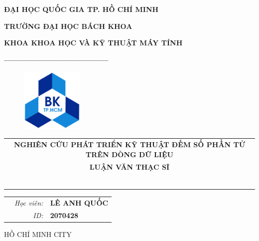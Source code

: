 \documentclass[a4paper,13pt]{article}
\theoremstyle{mytheor}
\begin{document}
\begin{titlepage}
\begin{center} {\textbf{ĐẠI HỌC QUỐC GIA TP. HỒ CHÍ MINH}
}

{\textbf{TRƯỜNG ĐẠI HỌC BÁCH KHOA}
}

{\textbf{KHOA KHOA HỌC VÀ KỸ THUẬT MÁY TÍNH }
}

{\textbf{---------------------------------------}}

\end{center}

\vspace{1cm}

\begin{figure}[h!]
\begin{center}
\includegraphics[width=3cm]{hcmut.png}
\end{center}
\end{figure}

\vspace{2cm}


\begin{center}
\begin{tabular}{c}
\multicolumn{1}{c}{\textbf{\Large NGHIÊN CỨU PHÁT TRIỂN KỸ THUẬT ĐẾM SỐ PHẦN TỬ TRÊN DÒNG DỮ LIỆU}}
\vspace{2cm}
\\
\multicolumn{1}{c}{\textbf{\Large LUẬN VĂN THẠC SĨ}}


~~\\

\\
\multicolumn{1}{l}{\textbf{{\Large}}}\\
\\
\textbf{{\Large}}\\

\\
\\

\end{tabular}
\end{center}

\vspace{1cm}

\begin{table}[h]
\begin{tabular}{rrl}
\hspace{5.1cm} 
&\textit{Học viên: } & \textbf{LÊ ANH QUỐC}\\
&\textit{ID: } & \textbf{2070428}\\

\end{tabular}
\end{table}
\vspace{3cm}
\begin{center}
{\footnotesize HỒ CHÍ MINH CITY}
\end{center}
\end{titlepage}
\end{document}
